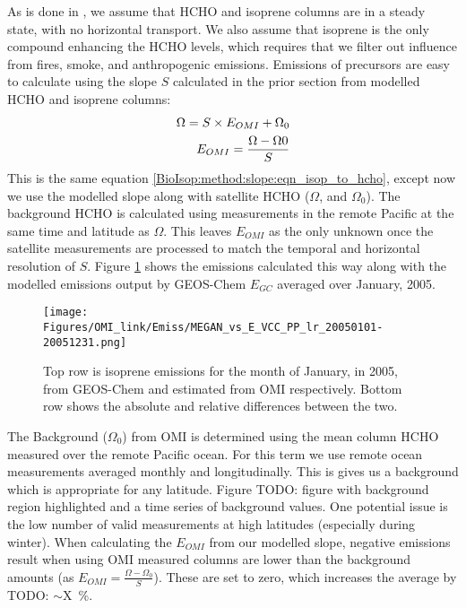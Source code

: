     
    As is done in \textcite{Palmer2003, Millet2006, Bauwens2016}, we assume that HCHO and isoprene columns are in a steady state, with no horizontal transport.
    We also assume that isoprene is the only compound enhancing the HCHO levels, which requires that we filter out influence from fires, smoke, and anthropogenic emissions.
    Emissions of precursors are easy to calculate using the slope $S$ calculated in the prior section from modelled HCHO and isoprene columns:
    \begin{eqnarray} \label{BioIsop:method:eqn_Enew}
      \Omega = S \times E_{OMI} + \Omega_0 \notag \\
      E_{OMI} = \frac{\Omega - \Omega{0}}{S}
    \end{eqnarray}
    This is the same equation \ref{BioIsop:method:slope:eqn_isop_to_hcho}, except now we use the modelled slope along with satellite HCHO ($\Omega$, and $\Omega_0$).
    The background HCHO is calculated using measurements in the remote Pacific at the same time and latitude as $\Omega$.
    This leaves $E_{OMI}$ as the only unknown once the satellite measurements are processed to match the temporal and horizontal resolution of $S$.
    Figure \ref{BioIsop:method:calculation:fig_E_isop_200501} shows the emissions calculated this way along with the modelled emissions output by GEOS-Chem $E_{GC}$ averaged over January, 2005.
    
      
    \begin{figure}
      \texttt{[image: Figures/OMI\_link/Emiss/MEGAN\_vs\_E\_VCC\_PP\_lr\_20050101-20051231.png]}
      \caption{%
        Top row is isoprene emissions for the month of January, in 2005, from GEOS-Chem and estimated from OMI respectively.
        Bottom row shows the absolute and relative differences between the two.
      }
      \label{BioIsop:method:calculation:fig_E_isop_200501}
    \end{figure}
    
    The Background ($\Omega_0$) from OMI is determined using the mean column HCHO measured over the remote Pacific ocean.
    For this term we use remote ocean measurements averaged monthly and longitudinally.
    This is gives us a background which is appropriate for any latitude.
    Figure TODO: figure with background region highlighted and a time series of background values.
    One potential issue is the low number of valid measurements at high latitudes (especially during winter).
    When calculating the $E_{OMI}$ from our modelled slope, negative emissions result when using OMI measured columns are lower than the background amounts (as $E_{OMI} = \frac{\Omega - \Omega_0}{S}$).
    These are set to zero, which increases the average by TODO: $\sim$X~\%.
    
